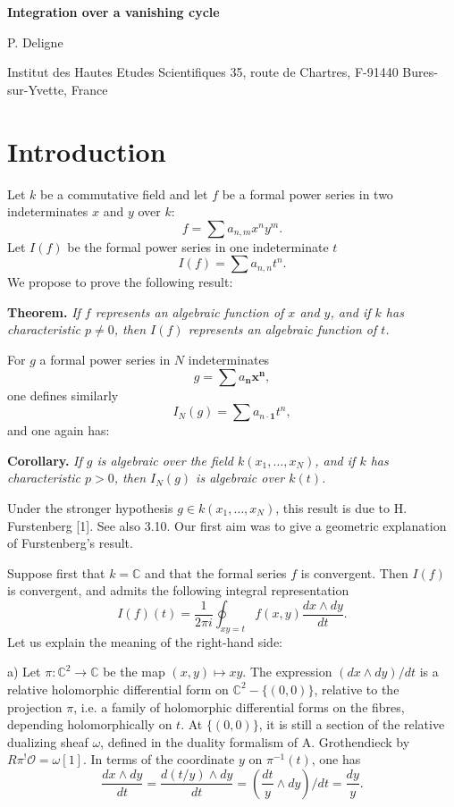 \documentclass[11pt,leqno]{article}
\newcommand{\OO}{\mathcal O}
\newcommand{\CC}{\mathbb C}
\begin{document}
\setcounter{page}{129}
\begin{center}
{\LARGE\bfseries Integration over a vanishing cycle}\par
\vspace{1.0em}
{\large P. Deligne}\par
\vspace{0.4em}
Institut des Hautes Etudes Scientifiques 35, route de Chartres, F-91440 Bures-sur-Yvette, France
\end{center}
\section*{Introduction}

Let $k$ be a commutative field and let $f$ be a formal power series in two indeterminates $x$ and $y$ over $k$:
\[
        f=\sum a_{n,m}x^ny^m.
\]
Let $I(f)$ be the formal power series in one indeterminate $t$
\[
        I(f)=\sum a_{n,n}t^n.
\]
We propose to prove the following result:

\medskip
\noindent\textbf{Theorem.} \emph{If $f$ represents an algebraic function of $x$ and $y$, and if $k$ has characteristic $p\ne0$, then $I(f)$ represents an algebraic function of $t$.}

\medskip
For $g$ a formal power series in $N$ indeterminates
\[
        g=\sum a_{\boldsymbol n}\boldsymbol x^{\boldsymbol n},
\]
one defines similarly
\[
        I_N(g)=\sum a_{n\cdot\mathbf 1}t^n,
\]
and one again has:

\medskip
\noindent\textbf{Corollary.} \emph{If $g$ is algebraic over the field $k(x_1,\ldots,x_N)$, and if $k$ has characteristic $p>0$, then $I_N(g)$ is algebraic over $k(t)$.}

\medskip
Under the stronger hypothesis $g\in k(x_1,\ldots,x_N)$, this result is due to H. Furstenberg [1]. See also 3.10. Our first aim was to give a geometric explanation of Furstenberg's result.

Suppose first that $k=\CC$ and that the formal series $f$ is convergent. Then $I(f)$ is convergent, and admits the following integral representation
\begin{equation}
        I(f)(t)=\frac{1}{2\pi i}\oint_{xy=t}f(x,y)\frac{dx\wedge dy}{dt}. \tag{1}
\end{equation}
\clearpage
Let us explain the meaning of the right-hand side:

\medskip
\noindent a) Let $\pi:\CC^2\to\CC$ be the map $(x,y)\mapsto xy$. The expression $(dx\wedge dy)/dt$ is a relative holomorphic differential form on $\CC^2-\{(0,0)\}$, relative to the projection $\pi$, i.e. a family of holomorphic differential forms on the fibres, depending holomorphically on $t$. At $\{(0,0)\}$, it is still a section of the relative dualizing sheaf $\omega$, defined in the duality formalism of A. Grothendieck by $R\pi^!\OO=\omega[1]$. In terms of the coordinate $y$ on $\pi^{-1}(t)$, one has
\[
        \frac{dx\wedge dy}{dt}=\frac{d(t/y)\wedge dy}{dt}
        =\left(\frac{dt}{y}\wedge dy\right)/dt=\frac{dy}{y}.
\]
\end{document}
